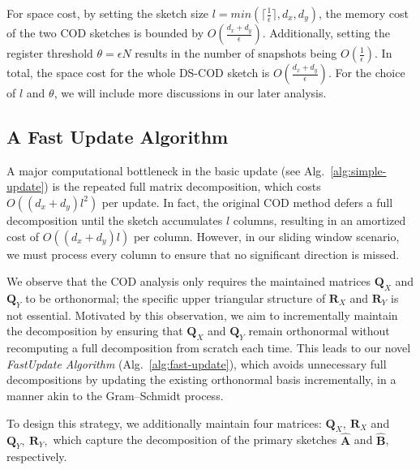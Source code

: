 For space cost, by setting the sketch size $l = min(\lceil \frac{1}{\epsilon}\rceil,d_x,d_y)$, the memory cost of the two COD sketches is bounded by $O(\frac{d_x+d_y}{\epsilon})$. Additionally, setting the register threshold $\theta = \epsilon N$ results in the number of snapshots being $O(\frac{1}{\epsilon})$. In total, the space cost for the whole DS-COD sketch is $O(\frac{d_x+d_y}{\epsilon})$. For the choice of $l$ and $\theta$, we will include more discussions in our later analysis. 



\subsection{A Fast Update Algorithm}


A major computational bottleneck in the basic \oursolution update (see Alg.\ \ref{alg:simple-update}) is the repeated full matrix decomposition, which costs \(O((d_x+d_y)l^2)\) per update. In fact, the original COD method defers a full decomposition until the sketch accumulates \(l\) columns, resulting in an amortized cost of \(O((d_x+d_y)l)\) per column. However, in our sliding window scenario, we must process every column to ensure that no significant direction is missed.

We observe that the COD analysis only requires the maintained matrices \(\boldsymbol{Q}_X\) and \(\boldsymbol{Q}_Y\) to be orthonormal; the specific upper triangular structure of \(\boldsymbol{R}_X\) and \(\boldsymbol{R}_Y\) is not essential. Motivated by this observation, we aim to incrementally maintain the decomposition by ensuring that \(\boldsymbol{Q}_X\) and \(\boldsymbol{Q}_Y\) remain orthonormal without recomputing a full decomposition from scratch each time. This leads to our novel \emph{FastUpdate Algorithm} (Alg.\ \ref{alg:fast-update}), which avoids unnecessary full decompositions by updating the existing orthonormal basis incrementally, in a manner akin to the Gram–Schmidt process.

To design this strategy, we additionally maintain four matrices:
\(
\boldsymbol{Q}_X,\ \boldsymbol{R}_X\) and \(\boldsymbol{Q}_Y,\ \boldsymbol{R}_Y,
\)
which capture the decomposition of the primary sketches \(\hat{\boldsymbol{A}}\) and \(\hat{\boldsymbol{B}}\), respectively.





